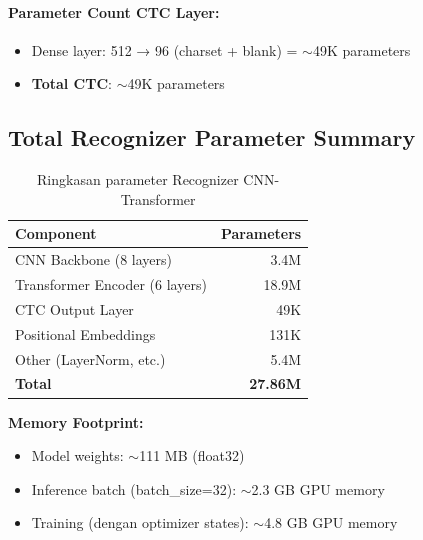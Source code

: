 \paragraph{Parameter Count CTC Layer:}
\begin{itemize}[nosep]
    \item Dense layer: 512 → 96 (charset + blank) = $\sim$49K parameters
    \item \textbf{Total CTC}: $\sim$49K parameters
\end{itemize}


\subsection{Total Recognizer Parameter Summary}

\begin{table}[H]
\centering
\caption{Ringkasan parameter Recognizer CNN-Transformer}
\label{tab:appendix-recognizer-summary}
\begin{tabular}{|l|r|}
\hline
\textbf{Component} & \textbf{Parameters} \\
\hline
CNN Backbone (8 layers) & 3.4M \\
\hline
Transformer Encoder (6 layers) & 18.9M \\
\hline
CTC Output Layer & 49K \\
\hline
Positional Embeddings & 131K \\
\hline
Other (LayerNorm, etc.) & 5.4M \\
\hline
\textbf{Total} & \textbf{27.86M} \\
\hline
\end{tabular}
\end{table}

\textbf{Memory Footprint:}
\begin{itemize}[nosep]
    \item Model weights: $\sim$111 MB (float32)
    \item Inference batch (batch\_size=32): $\sim$2.3 GB GPU memory
    \item Training (dengan optimizer states): $\sim$4.8 GB GPU memory
\end{itemize}


